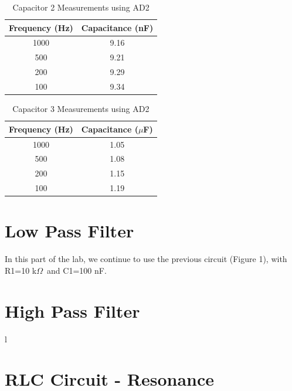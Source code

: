 \documentclass{article}
\renewcommand{\O}{\(\Omega\)}
\begin{document}
\begin{table}[H]
    \centering
    \begin{tabular}{c|c}
        Frequency (Hz) & Capacitance (nF)\\
        \hline
        1000 & 9.16\\
        500 & 9.21\\
        200 & 9.29\\
        100 & 9.34
    \end{tabular}
    \caption{Capacitor 2 Measurements using AD2}
\end{table}

\begin{table}[H]
    \centering
    \begin{tabular}{c|c}
        Frequency (Hz) & Capacitance (\(\mu\)F)\\
        \hline
        1000 & 1.05\\
        500 & 1.08\\
        200 & 1.15\\
        100 & 1.19
    \end{tabular}
    \caption{Capacitor 3 Measurements using AD2}
\end{table}

\section{Low Pass Filter}
In this part of the lab, we continue to use the previous circuit (Figure 1), with R1=10 k\O\ and C1=100 nF. 

\section{High Pass Filter}  l


\section{RLC Circuit - Resonance}
\end{document}
